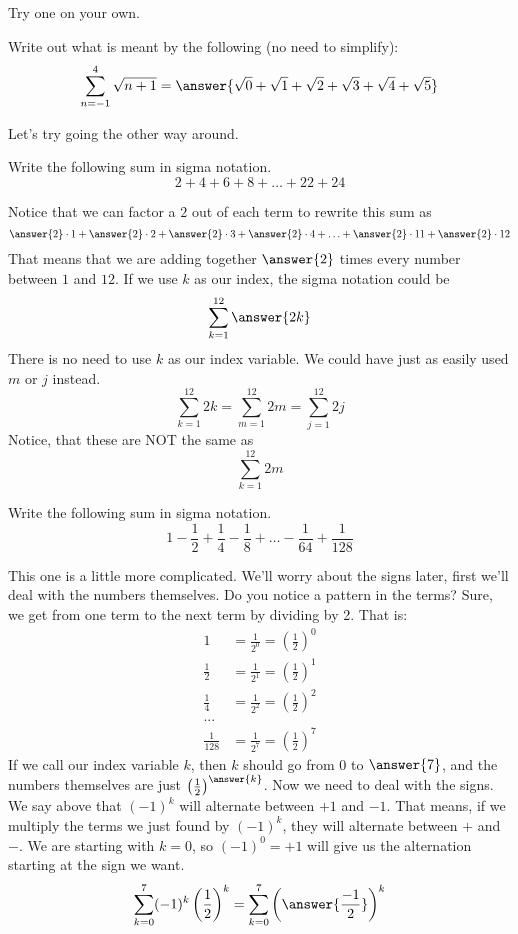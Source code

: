 \documentclass{ximera}
\begin{document}
Try one on your own.
\begin{question}
	Write out what is meant by the following (no need to simplify):
	\[ \sum_{n=-1}^{4} \sqrt{n+1} =\answer{\sqrt{0}+\sqrt{1}+\sqrt{2}+\sqrt{3}+\sqrt{4}+\sqrt{5}}\]
\end{question}
 

Let's try going the other way around.
\begin{example}
	Write the following sum in sigma notation.
	\[ 2 + 4 + 6 + 8 + \ldots + 22 + 24 \]
	\begin{explanation}
		Notice that we can factor a $2$ out of each term to rewrite this sum as
		\[ \answer{2}\cdot 1 + \answer{2} \cdot 2 + \answer{2}\cdot 3 + \answer{2} \cdot 4 + \ldots + \answer{2}\cdot 11 + \answer{2}\cdot 12 \]
		That means that we are adding together $\answer{2}$ times every number between $1$ and $12$.  If we use $k$ as our index, the sigma notation could be
		\[ \sum_{k=1}^{12} \answer{2k} \]
		There is no need to use $k$ as our index variable.  We could have just as easily used $m$ or $j$ instead.
		\[ \sum_{k=1}^{12} 2k = \sum_{m=1}^{12} 2m = \sum_{j=1}^{12} 2j\]  
		Notice, that these are NOT the same as
		\[ \sum_{k=1}^{12} 2m \]
	\end{explanation}
\end{example}
 

\begin{example}
	Write the following sum in sigma notation.
	\[ 1 - \frac{1}{2} + \frac{1}{4} - \frac{1}{8} + \ldots - \frac{1}{64} + \frac{1}{128}  \]
	\begin{explanation}
		This one is a little more complicated.  We'll worry about the signs later, first we'll deal with the numbers themselves.  Do you notice a pattern in the terms?
		Sure, we get from one term to the next term by dividing by 2.  That is:
		\begin{align*}
			1 &= \frac{1}{2^0} = \left(\frac{1}{2}\right)^0\\
			\frac{1}{2} &= \frac{1}{2^1} = \left(\frac{1}{2}\right)^{1}\\
			\frac{1}{4} &= \frac{1}{2^2} = \left(\frac{1}{2}\right)^{2}\\
				 ...  \\
			 \frac{1}{128} &= \frac{1}{2^7} = \left(\frac{1}{2}\right)^{7}
		\end{align*}
		If we call our index variable $k$, then $k$ should go from $0$ to $\answer{7}$, and the numbers themselves are just $\left(\frac{1}{2}\right)^{\answer{k}}$.  Now we need to deal with the signs.
		We say above that $(-1)^k$ will alternate between $+1$ and $-1$.  That means, if we multiply the terms we just found by $(-1)^k$, they will alternate between $+$ and $-$.  
		We are starting with $k=0$, so $(-1)^0 = +1$ will give us the alternation starting at the sign we want.
		\[ \sum_{k=0}^{7} (-1)^k \left(\frac{1}{2}\right)^{k} = \sum_{k=0}^7 \left( \answer{\frac{-1}{2}} \right)^k \]
	\end{explanation}
\end{example}
  
\end{document}
